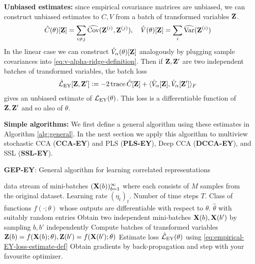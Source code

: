 \textbf{Unbiased estimates:}
since empirical covariance matrices are unbiased, we can construct unbiased estimates to $C, V$ from a batch of transformed variables $\mathbf{Z}$.
\begin{align}\label{eq:def-C-V-matrices-empirical}
    \hat{C}(\theta)[\mathbf{Z}] = \sum_{i \neq j} \widehat{\mathrm{Cov}}(\mathbf{Z}^{(i)}, \mathbf{Z}^{(j)}), \quad 
    \hat{V}(\theta)[\mathbf{Z}] = \sum_{i} \widehat{\mathrm{Var}}(\mathbf{Z}^{(i)})
\end{align}
In the linear case we can construct $\hat{V}_\alpha(\theta)[\mathbf{Z}]$ analogously by plugging sample covariances into \cref{eq:v-alpha-ridge-definition}.
Then if $\mathbf{Z}, \mathbf{Z}'$ are two independent batches of transformed variables, the batch loss
\begin{align}\label{eq:empirical-EY-loss-estimate-def}
    \hat{\mathcal{L}}_\text{EY}[\mathbf{Z}, \mathbf{Z}'] \vcentcolon= - 2 \operatorname{trace} \hat{C}[\mathbf{Z}] + \langle \hat{V}_\alpha[\mathbf{Z}], \hat{V}_\alpha[\mathbf{Z}'] \rangle_F
\end{align}
gives an unbiased estimate of $\mathcal{L}_\text{EY}(\theta)$.%
This loss is a differentiable function of $\mathbf{Z}, \mathbf{Z}'$ and so also of $\theta$.

\textbf{Simple algorithms:}
We first define a general algorithm using these estimates in Algorithm \ref{alg:general}. In the next section we apply this algorithm to multiview stochastic CCA (\textbf{CCA-EY}) and PLS (\textbf{PLS-EY}), Deep CCA (\textbf{DCCA-EY}), and SSL (\textbf{SSL-EY}).

\begin{algorithm}
   \caption{\textbf{GEP-EY}: General algorithm for learning correlated representations}
   \label{alg:general}
\begin{algorithmic}
    data stream of mini-batches $(\mathbf{X}(b))_{b=1}^\infty$ where each consists of $M$ samples from the original dataset. Learning rate $(\eta_t)_t$. Number of time steps $T$. Class of functions $f(\cdot; \theta)$ whose outputs are differentiable with respect to $\theta$.
    $\hat{\theta}$ with suitably random entries
       \STATE Obtain two independent mini-batches \( \mathbf{X}(b), \mathbf{X}(b') \) by sampling \( b, b' \) independently
       \STATE Compute batches of transformed variables $\mathbf{Z}(b) = f(\mathbf{X}(b); \theta), \mathbf{Z}(b') = f(\mathbf{X}(b'); \theta)$
       \STATE Estimate loss $\hat{\mathcal{L}}_\text{EY}(\theta)$ using \cref{eq:empirical-EY-loss-estimate-def}
       \STATE Obtain gradients by back-propagation and step with your favourite optimizer.
   \ENDFOR
\end{algorithmic}
\end{algorithm}

